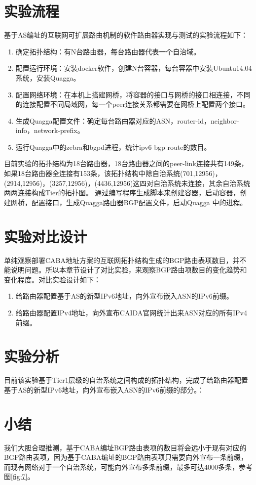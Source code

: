 \section{实验流程}
基于AS编址的互联网可扩展路由机制的软件路由器实现与测试的实验流程如下：
\begin{enumerate}
\item 确定拓扑结构：有N台路由器，每台路由器代表一个自治域。
\item 配置运行环境：安装docker软件，创建N台容器，每台容器中安装Ubuntu14.04系统，安装Quagga。
\item 配置网络环境：在本机上搭建网桥，将容器的接口与网桥的接口相连接，不同的连接配置不同局域网，每一个peer连接关系都需要在网桥上配置两个接口。
\item 生成Quagga配置文件：确定每台路由器对应的ASN，router-id，neighbor-info，network-prefix。
\item 运行Quagga中的zebra和bgpd进程，统计ipv6 bgp route的数目。
\end{enumerate}
目前实验的拓扑结构为18台路由器，18台路由器之间的peer-link连接共有149条，如果18台路由器全连接有153条，该拓扑结构中除自治系统(701,12956)，(2914,12956)，(3257,12956)，(4436,12956)这四对自治系统未连接，其余自治系统两两连接构成Tier的拓扑图。
通过编写程序生成脚本来创建容器，启动容器，创建网桥，配置接口，生成Quagga路由器BGP配置文件，启动Quagga 中的进程。
\section{实验对比设计}
单纯观察部署CABA地址方案的互联网拓扑结构生成的BGP路由表项数目，并不能说明问题。所以本章节设计了对比实验，来观察BGP路由项数目的变化趋势和变化程度。对比实验设计如下：
\begin{enumerate}
\item 给路由器配置基于AS的新型IPv6地址，向外宣布嵌入ASN的IPv6前缀。
\item 给路由器配置IPv4地址，向外宣布CAIDA官网统计出来ASN对应的所有IPv4前缀。
\end{enumerate}
\section{实验分析}

目前该实验基于Tier1层级的自治系统之间构成的拓扑结构，完成了给路由器配置基于AS的新型IPv6地址，向外宣布嵌入ASN的IPv6前缀的部分。：

\section{小结}
我们大胆合理推测，基于CABA编址BGP路由表项的数目将会远小于现有对应的BGP路由表项，因为基于CABA编址的BGP路由表项只需要向外宣布一条前缀，而现有网络对于一个自治系统，可能向外宣布多条前缀，最多可达4000多条，参考图\ref{fig:7}。
